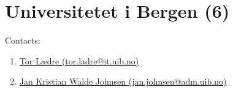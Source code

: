 \section{Universitetet i Bergen (6)}
\label{sec:UiB}

Contacts:
\begin{enumerate}
 \item {}\href{mailto:tor.ladre@it.uib.no}{Tor Lædre (tor.ladre@it.uib.no)}
 \item {}\href{mailto:jan.johnsen@adm.uib.no}{Jan Kristian Walde Johnsen (jan.johnsen@adm.uib.no)}
\end{enumerate}

